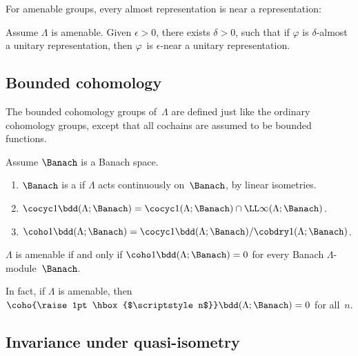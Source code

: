 For amenable groups, every almost representation is near a representation:

\begin{thm} \label{AlmRepsAreNear}
Assume $\Lambda$ is amenable. Given $\epsilon > 0$, there exists $\delta > 0$, such that if $\varphi$ is $\delta$-almost a unitary representation, then $\varphi$~is $\epsilon$-near a unitary representation.
\end{thm}



\subsection{Bounded cohomology}

The bounded cohomology groups of~$\Lambda$ are defined just like the ordinary cohomology groups, except that all cochains are assumed to be bounded functions.

\begin{defn}
Assume $\Banach$ is a Banach space.
\noprelistbreak
	\begin{enumerate}
	\item $\Banach $ is a  if $\Lambda$ acts continuously on~$\Banach$, by linear isometries.
	\item $\cocyc1\bdd(\Lambda;\Banach) = \cocyc1(\Lambda;\Banach) \cap \LL\infty(\Lambda;\Banach)$.
	\item $\coho1\bdd(\Lambda;\Banach) = \cocyc1\bdd(\Lambda;\Banach) / \cobdry1(\Lambda;\Banach)$.
	\end{enumerate}
\end{defn} 

\begin{thm} \label{AmenBddCoho0}
$\Lambda$ is amenable if and only if\/ $\coho1\bdd(\Lambda;\Banach) = 0$ for every Banach $\Lambda$-module~$\Banach$.
\end{thm}

\begin{rem} \label{AmenBddCoho0Alln}
In fact, if $\Lambda$ is amenable, then $\coho {\raise 1pt \hbox{$\scriptstyle n$}}\bdd(\Lambda;\Banach) = 0$ for all~$n$.
\end{rem}





\subsection{Invariance under quasi-isometry}

